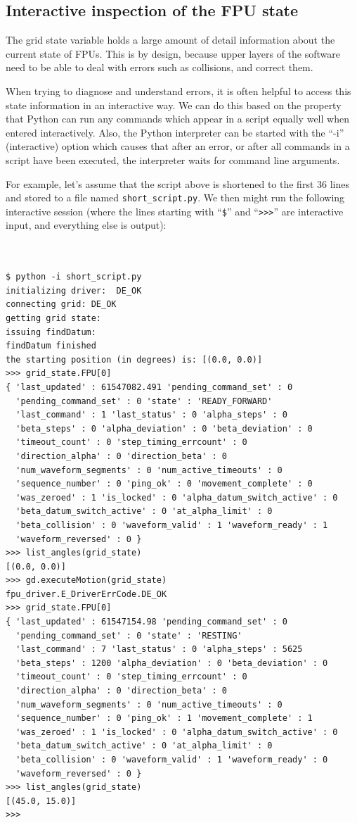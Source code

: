 \documentclass{scrartcl}[12pt,a4paper]
\begin{document}
\subsection{Interactive inspection of the FPU state}

\label{sec:fpustate}
The grid state variable holds a large amount of detail information
about the current state of FPUs. This is by design, because
upper layers of the software need to be able to deal with
errors such as collisions, and correct them.

When trying to diagnose and understand errors, it is often helpful to
access this state information in an interactive way.
We can do this based on the property that Python can
run any commands which appear in a script equally well
when entered interactively. Also, the Python interpreter
can be started with the ``-i'' (interactive) option which
causes that after an error, or after all commands
in a script have been executed, the interpreter waits
for command line arguments.

For example, let's assume that the script above is shortened to the
first 36 lines and stored to a file named
\texttt{short\_script.py}. We then might run the following interactive
session (where the lines starting with ``\texttt{\$}'' and
``\texttt{>>>}'' are interactive input, and everything else is
output):



\begin{verbatim}

  
$ python -i short_script.py
initializing driver:  DE_OK
connecting grid: DE_OK
getting grid state:
issuing findDatum:
findDatum finished
the starting position (in degrees) is: [(0.0, 0.0)]
>>> grid_state.FPU[0]
{ 'last_updated' : 61547082.491 'pending_command_set' : 0
  'pending_command_set' : 0 'state' : 'READY_FORWARD'
  'last_command' : 1 'last_status' : 0 'alpha_steps' : 0
  'beta_steps' : 0 'alpha_deviation' : 0 'beta_deviation' : 0
  'timeout_count' : 0 'step_timing_errcount' : 0
  'direction_alpha' : 0 'direction_beta' : 0
  'num_waveform_segments' : 0 'num_active_timeouts' : 0
  'sequence_number' : 0 'ping_ok' : 0 'movement_complete' : 0
  'was_zeroed' : 1 'is_locked' : 0 'alpha_datum_switch_active' : 0
  'beta_datum_switch_active' : 0 'at_alpha_limit' : 0
  'beta_collision' : 0 'waveform_valid' : 1 'waveform_ready' : 1
  'waveform_reversed' : 0 }
>>> list_angles(grid_state)
[(0.0, 0.0)]
>>> gd.executeMotion(grid_state)
fpu_driver.E_DriverErrCode.DE_OK
>>> grid_state.FPU[0]
{ 'last_updated' : 61547154.98 'pending_command_set' : 0
  'pending_command_set' : 0 'state' : 'RESTING'
  'last_command' : 7 'last_status' : 0 'alpha_steps' : 5625
  'beta_steps' : 1200 'alpha_deviation' : 0 'beta_deviation' : 0
  'timeout_count' : 0 'step_timing_errcount' : 0
  'direction_alpha' : 0 'direction_beta' : 0
  'num_waveform_segments' : 0 'num_active_timeouts' : 0
  'sequence_number' : 0 'ping_ok' : 1 'movement_complete' : 1
  'was_zeroed' : 1 'is_locked' : 0 'alpha_datum_switch_active' : 0
  'beta_datum_switch_active' : 0 'at_alpha_limit' : 0
  'beta_collision' : 0 'waveform_valid' : 1 'waveform_ready' : 0
  'waveform_reversed' : 0 }
>>> list_angles(grid_state)
[(45.0, 15.0)]
>>>
\end{verbatim}
\end{document}

